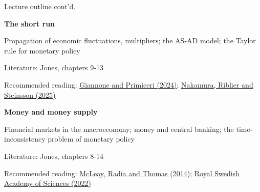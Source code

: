 \documentclass[10pt,handout]{beamer}
\begin{document}
\begin{frame}{Lecture outline cont'd.}
\begin{itemize}
    \item [L7.] \textbf{The short run}
    \small{
    \item[] Propagation of economic fluctuations, multipliers; the AS-AD model; the Taylor rule for monetary policy
    \item[] Literature: Jones, chapters 9-13
    \item[] Recommended reading: 
    \href{https://cepr.org/voxeu/columns/drivers-post-pandemic-inflation}{Giannone and Primiceri (2024)}; \href{https://eml.berkeley.edu/~jsteinsson/papers/Taylor_Rule.pdf}{Nakamura, Riblier and Steinsson (2025)}
    }
\end{itemize}

\bigskip

\begin{itemize}
    \item[L8.] \textbf{Money and money supply}
    \small{
    \item[] Financial markets in the macroeconomy; money and central banking; the time-inconsistency problem of monetary policy
    \item[] Literature: Jones, chapters 8-14
    \item[] Recommended reading: \href{https://www.bankofengland.co.uk/-/media/boe/files/quarterly-bulletin/2014/money-in-the-modern-economy-an-introduction.pdf}{McLeay, Radia and Thomas (2014)}; \href{https://www.nobelprize.org/uploads/2022/10/popular-economicsciencesprize2022-2.pdf}{Royal Swedish Academy of Sciences (2022)}
    }
\end{itemize}
\end{frame}
\end{document}
